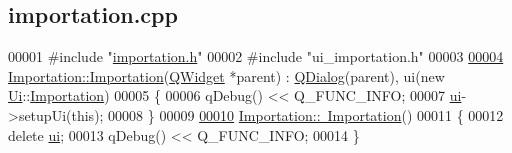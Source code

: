 \hypertarget{importation_8cpp_source}{}\subsection{importation.\+cpp}

\begin{DoxyCode}
00001 \textcolor{preprocessor}{#include "\hyperlink{importation_8h}{importation.h}"}
00002 \textcolor{preprocessor}{#include "ui\_importation.h"}
00003 
\hyperlink{class_importation_ad3a625fb90d559ff048151a4cb4646b4}{00004} \hyperlink{class_importation_ad3a625fb90d559ff048151a4cb4646b4}{Importation::Importation}(\hyperlink{class_q_widget}{QWidget} *parent) : 
      \hyperlink{class_q_dialog}{QDialog}(parent), ui(new \hyperlink{namespace_ui}{Ui}::\hyperlink{class_importation}{Importation})
00005 \{
00006      qDebug() << Q\_FUNC\_INFO;
00007     \hyperlink{class_importation_ace5d522c27957bac47fd8d3234af1d2e}{ui}->setupUi(\textcolor{keyword}{this});
00008 \}
00009 
\hyperlink{class_importation_ac9f6f0a390369d5732576fb38a8e62c7}{00010} \hyperlink{class_importation_ac9f6f0a390369d5732576fb38a8e62c7}{Importation::~Importation}()
00011 \{
00012     \textcolor{keyword}{delete} \hyperlink{class_importation_ace5d522c27957bac47fd8d3234af1d2e}{ui};
00013     qDebug() << Q\_FUNC\_INFO;
00014 \}
\end{DoxyCode}
